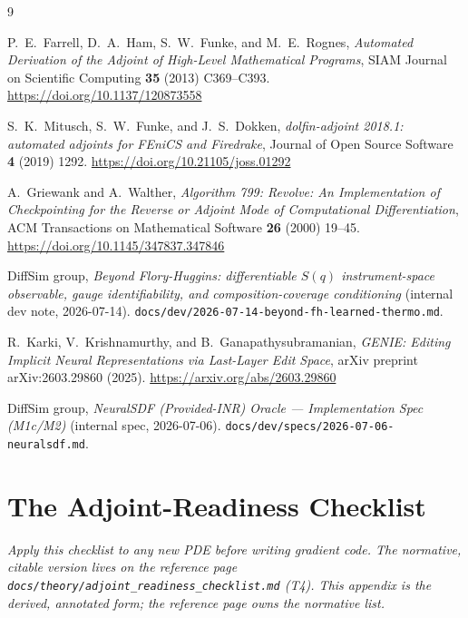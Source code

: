 \documentclass[11pt]{article}
\begin{document}
\begin{thebibliography}{9}

P.~E.~Farrell, D.~A.~Ham, S.~W.~Funke, and M.~E.~Rognes,
\emph{Automated Derivation of the Adjoint of High-Level Mathematical
Programs},
SIAM Journal on Scientific Computing \textbf{35} (2013) C369--C393.
\url{https://doi.org/10.1137/120873558}

S.~K.~Mitusch, S.~W.~Funke, and J.~S.~Dokken,
\emph{dolfin-adjoint 2018.1: automated adjoints for FEniCS and Firedrake},
Journal of Open Source Software \textbf{4} (2019) 1292.
\url{https://doi.org/10.21105/joss.01292}

A.~Griewank and A.~Walther,
\emph{Algorithm 799: Revolve: An Implementation of Checkpointing for the
Reverse or Adjoint Mode of Computational Differentiation},
ACM Transactions on Mathematical Software \textbf{26} (2000) 19--45.
\url{https://doi.org/10.1145/347837.347846}

DiffSim group,
\emph{Beyond Flory-Huggins: differentiable $S(q)$ instrument-space
observable, gauge identifiability, and composition-coverage conditioning}
(internal dev note, 2026-07-14).
\texttt{docs/dev/2026-07-14-beyond-fh-learned-thermo.md}.

R.~Karki, V.~Krishnamurthy, and B.~Ganapathysubramanian,
\emph{GENIE: Editing Implicit Neural Representations via Last-Layer Edit
Space},
arXiv preprint arXiv:2603.29860 (2025).
\url{https://arxiv.org/abs/2603.29860}

DiffSim group,
\emph{NeuralSDF (Provided-INR) Oracle --- Implementation Spec (M1c/M2)}
(internal spec, 2026-07-06).
\texttt{docs/dev/specs/2026-07-06-neuralsdf.md}.

\end{thebibliography}

\appendix

\section{The Adjoint-Readiness Checklist}
\label{app:checklist}

\emph{Apply this checklist to any new PDE before writing gradient code.
The normative, citable version lives on the reference page
\texttt{docs/theory/}\linebreak\texttt{adjoint\_readiness\_checklist.md} (T4).
This appendix is the derived, annotated form; the reference page owns
the normative list.}
\end{document}
